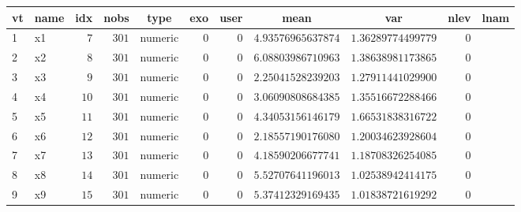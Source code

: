 %
\begin{table}[!tbp]
\begin{center}
\begin{tabular}{llrrlrrrrrl}
\hline\hline
\multicolumn{1}{l}{vt}&\multicolumn{1}{c}{name}&\multicolumn{1}{c}{idx}&\multicolumn{1}{c}{nobs}&\multicolumn{1}{c}{type}&\multicolumn{1}{c}{exo}&\multicolumn{1}{c}{user}&\multicolumn{1}{c}{mean}&\multicolumn{1}{c}{var}&\multicolumn{1}{c}{nlev}&\multicolumn{1}{c}{lnam}\tabularnewline
\hline
1&x1&$ 7$&$301$&numeric&$0$&$0$&$4.93576965637874$&$1.36289774499779$&$0$&\tabularnewline
2&x2&$ 8$&$301$&numeric&$0$&$0$&$6.08803986710963$&$1.38638981173865$&$0$&\tabularnewline
3&x3&$ 9$&$301$&numeric&$0$&$0$&$2.25041528239203$&$1.27911441029900$&$0$&\tabularnewline
4&x4&$10$&$301$&numeric&$0$&$0$&$3.06090808684385$&$1.35516672288466$&$0$&\tabularnewline
5&x5&$11$&$301$&numeric&$0$&$0$&$4.34053156146179$&$1.66531838316722$&$0$&\tabularnewline
6&x6&$12$&$301$&numeric&$0$&$0$&$2.18557190176080$&$1.20034623928604$&$0$&\tabularnewline
7&x7&$13$&$301$&numeric&$0$&$0$&$4.18590206677741$&$1.18708326254085$&$0$&\tabularnewline
8&x8&$14$&$301$&numeric&$0$&$0$&$5.52707641196013$&$1.02538942414175$&$0$&\tabularnewline
9&x9&$15$&$301$&numeric&$0$&$0$&$5.37412329169435$&$1.01838721619292$&$0$&\tabularnewline
\hline
\end{tabular}
\end{center}
\end{table}

